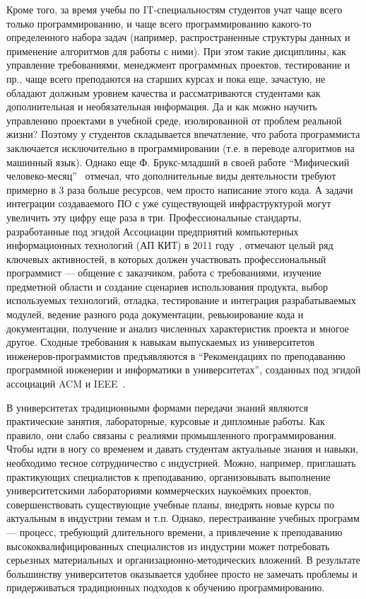 \documentclass[a4paper]{article}
\begin{document}
Кроме того, за время учебы по IT-специальностям студентов учат чаще всего только программированию, и чаще всего программированию  какого-то определенного набора задач (например, распространенные структуры данных и применение алгоритмов для работы с ними). При этом такие дисциплины, как управление требованиями, менеджмент программных проектов, тестирование и пр., чаще всего преподаются на старших курсах и пока еще, зачастую, не обладают должным уровнем качества и рассматриваются студентами как дополнительная и необязательная информация. Да и как можно научить управлению проектами в учебной среде, изолированной от проблем реальной жизни? Поэтому у студентов складывается впечатление, что работа программиста заключается исключительно в программировании  (т.е. в переводе алгоритмов на машинный язык). Однако еще Ф. Брукс-младший в своей работе ``Мифический человеко-месяц''~\cite{brooks} отмечал, что дополнительные виды деятельности требуют примерно в 3 раза больше ресурсов, чем просто написание этого кода. А задачи интеграции создаваемого ПО с уже существующей инфраструктурой могут увеличить эту цифру еще раза в три. Профессиональные стандарты, разработанные под эгидой Ассоциации предприятий компьютерных информационных технологий (АП КИТ) в 2011 году~\cite{apkit},  отмечают целый ряд ключевых активностей, в которых должен участвовать профессиональный программист --- общение с заказчиком, работа с требованиями, изучение предметной области и создание сценариев использования продукта, выбор используемых технологий, отладка, тестирование и интеграция разрабатываемых модулей, ведение разного рода документации, ревьюирование кода и документации, получение и анализ численных характеристик проекта и многое другое. Сходные требования к навыкам  выпускаемых из университетов инженеров-программистов предъявляются в ``Рекомендациях по преподаванию программной инженерии и информатики в университетах'', созданных под эгидой ассоциаций ACM и  IEEE~\cite{curriculum, terekhov2}. 

В университетах традиционными формами передачи знаний  являются практические занятия, лабораторные, курсовые и дипломные работы. Как правило, они слабо связаны с реалиями промышленного программирования. Чтобы идти в ногу со временем и давать студентам актуальные знания и навыки, необходимо тесное сотрудничество с индустрией. Можно, например, приглашать практикующих специалистов к преподаванию, организовывать выполнение университетскими лабораториями коммерческих наукоёмких  проектов, совершенствовать существующие учебные планы, внедрять новые курсы по актуальным в индустрии темам и  т.п. Однако, перестраивание учебных программ --- процесс, требующий длительного времени, а привлечение к преподаванию высококвалифицированных специалистов из индустрии может потребовать серьезных материальных и организационно-методических вложений. В результате большинству университетов оказывается удобнее просто не замечать проблемы и придерживаться традиционных подходов к обучению программированию.
\end{document}
